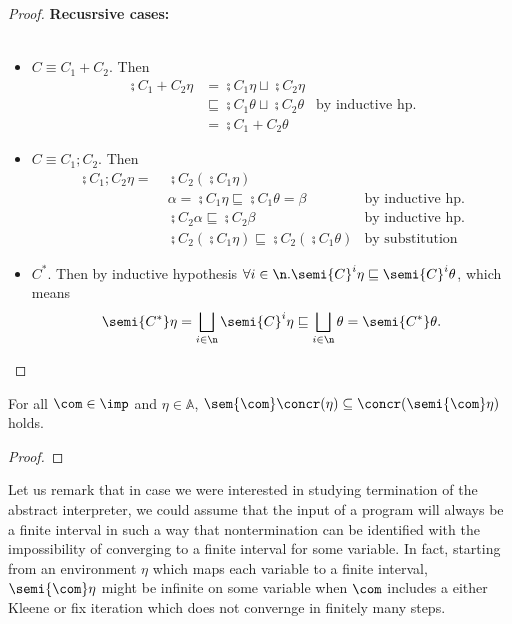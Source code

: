 \begin{proof}
  \noindent
  \textbf{Recusrsive cases:}\ \\ \
  \begin{itemize}
  \item \(C \equiv C_1 + C_2\). Then
    \begin{align*}
      \semi{C_1 + C_2}\eta & = \semi{C_1}\eta \sqcup \semi{C_2}\eta & \\
      & \sqsubseteq \semi{C_1}\theta \sqcup \semi{C_2}\theta & \text{by inductive hp.} \\
      & = \semi{C_1 + C_2}\theta
    \end{align*}
  \item \(C \equiv C_1 ; C_2\). Then
    \begin{align*}
      \semi{C_1;C_2}\eta = \; & \semi{C_2}(\semi{C_1}\eta) & \\
      & \alpha = \semi{C_1}\eta \sqsubseteq \semi{C_1}\theta = \beta & \text{by inductive hp.} \\
      & \semi{C_2}\alpha \sqsubseteq \semi{C_2}\beta & \text{by inductive hp.} \\
      & \semi{C_2}(\semi{C_1}\eta) \sqsubseteq \semi{C_2}(\semi{C_1}\theta) & \text{by substitution}
    \end{align*}
  \item \(C^*\). Then by inductive hypothesis \(\forall i \in \n
    . \semi{C}^i\eta \sqsubseteq \semi{C}^i\theta\), which means
    \[\semi{C^*}\eta = \bigsqcup_{i\in\n}\semi{C}^i\eta \sqsubseteq
    \bigsqcup_{i\in\n}\theta = \semi{C^*}\theta.\]
  \end{itemize}
\end{proof}

\begin{theorem}
  For all \(\com \in \imp\) and \(\eta\in \mathbb{A}\), 
  \(\sem{\com}\concr(\eta) \subseteq \concr(\semi{\com}\eta)\) holds. 
\end{theorem}

\begin{proof}
  
\end{proof}

\begin{remark}
  Let us remark that in case we were interested in studying
  termination of the abstract interpreter, we could assume that the
  input of a program will always be a finite interval in such a way
  that nontermination can be identified with the impossibility of
  converging to a finite interval for some variable. In fact, starting
  from an environment \(\eta\) which maps each variable to a finite
  interval, \(\semi{\com}\eta\) might be infinite on some variable
  when \(\com\) includes a either Kleene or fix iteration which does
  not convernge in finitely many steps.
\end{remark}

